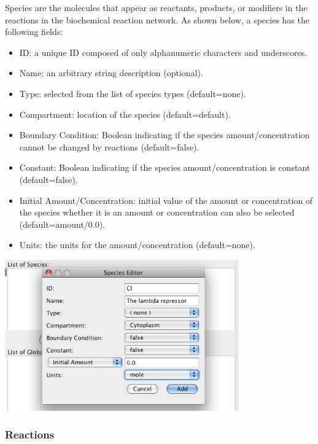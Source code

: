 \documentclass[titlepage,11pt]{article}
\begin{document}
\noindent
Species are the molecules that appear as reactants, products, or modifiers
in the reactions in the biochemical reaction network. 
As shown below, a species has the following fields:
\begin{itemize}
\item ID: a unique ID composed of only alphanumeric characters and 
       underscores.
\item Name: an arbitrary string description (optional).
\item Type: selected from the list of species types (default=none).
\item Compartment: location of the species (default=default).
\item Boundary Condition: Boolean indicating if the species 
       amount/concentration
       cannot be changed by reactions (default=false).
\item Constant: Boolean indicating if the species amount/concentration 
       is constant (default=false).
\item Initial Amount/Concentration: initial value of the amount or 
       concentration of the species whether it is an amount or concentration
       can also be selected (default=amount/0.0).
\item Units: the units for the amount/concentration (default=none).
\end{itemize}
\begin{center}
\includegraphics[height=65mm]{screenshots/species}
\end{center}

\subsubsection{\label{reactions}Reactions}
\end{document}

